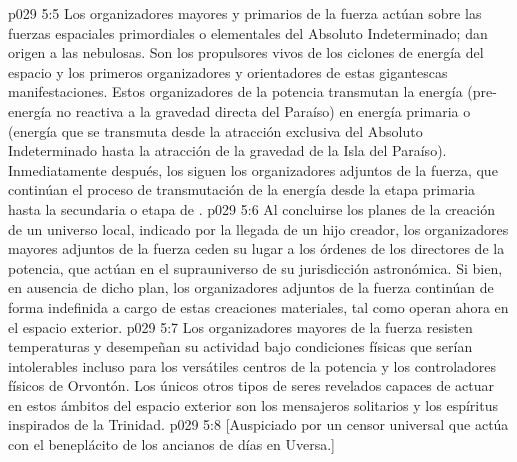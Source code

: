 \vs p029 5:5 \pc Los organizadores mayores y primarios de la fuerza actúan sobre las fuerzas espaciales primordiales o elementales del Absoluto Indeterminado; dan origen a las nebulosas. Son los propulsores vivos de los ciclones de energía del espacio y los primeros organizadores y orientadores de estas gigantescas manifestaciones. Estos organizadores de la potencia transmutan la energía  (pre\hyp{}energía no reactiva a la gravedad directa del Paraíso) en energía primaria o  (energía que se transmuta desde la atracción exclusiva del Absoluto Indeterminado hasta la atracción de la gravedad de la Isla del Paraíso). Inmediatamente después, los siguen los organizadores adjuntos de la fuerza, que continúan el proceso de transmutación de la energía desde la etapa primaria hasta la secundaria o etapa de .
\vs p029 5:6 Al concluirse los planes de la creación de un universo local, indicado por la llegada de un hijo creador, los organizadores mayores adjuntos de la fuerza ceden su lugar a los órdenes de los directores de la potencia, que actúan en el suprauniverso de su jurisdicción astronómica. Si bien, en ausencia de dicho plan, los organizadores adjuntos de la fuerza continúan de forma indefinida a cargo de estas creaciones materiales, tal como operan ahora en el espacio exterior.
\vs p029 5:7 Los organizadores mayores de la fuerza resisten temperaturas y desempeñan su actividad bajo condiciones físicas que serían intolerables incluso para los versátiles centros de la potencia y los controladores físicos de Orvontón. Los únicos otros tipos de seres revelados capaces de actuar en estos ámbitos del espacio exterior son los mensajeros solitarios y los espíritus inspirados de la Trinidad.
\vsetoff
\vs p029 5:8 [Auspiciado por un censor universal que actúa con el beneplácito de los ancianos de días en Uversa.]
